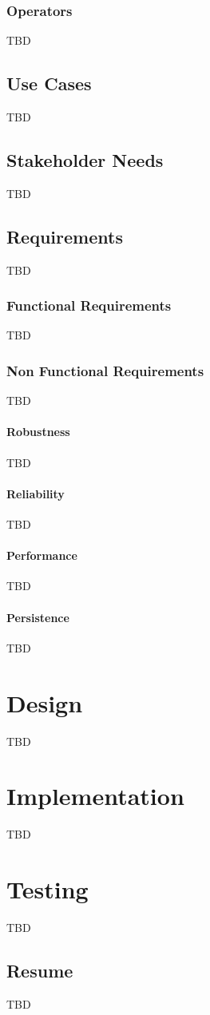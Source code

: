 \documentclass[a4paper,12pt]{book}
\begin{document}
\section{Operators}
TBD

\chapter{Use Cases}
TBD

\chapter{Stakeholder Needs}
TBD

\chapter{Requirements}
TBD

\section{Functional Requirements}
TBD

\section{Non Functional Requirements}
TBD

\subsection{Robustness}
TBD

\subsection{Reliability}
TBD

\subsection{Performance}
TBD

\subsection{Persistence}
TBD

\part{Design}
TBD

\part{Implementation}
TBD

\part{Testing}
TBD

\chapter{Resume}
TBD
\end{document}
